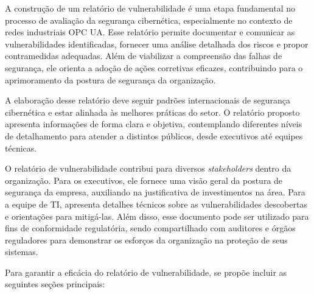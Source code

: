         A construção de um relatório de vulnerabilidade é uma etapa fundamental no processo de avaliação da segurança cibernética, especialmente no contexto de redes industriais OPC UA. Esse relatório permite documentar e comunicar as vulnerabilidades identificadas, fornecer uma análise detalhada dos riscos e propor contramedidas adequadas. Além de viabilizar a compreensão das falhas de segurança, ele orienta a adoção de ações corretivas eficazes, contribuindo para o aprimoramento da postura de segurança da organização.

        A elaboração desse relatório deve seguir padrões internacionais de segurança cibernética e estar alinhada às melhores práticas do setor. O relatório proposto apresenta informações de forma clara e objetiva, contemplando diferentes níveis de detalhamento para atender a distintos públicos, desde executivos até equipes técnicas.
        
        O relatório de vulnerabilidade contribui para diversos \textit{stakeholders} dentro da organização. Para os executivos, ele fornece uma visão geral da postura de segurança da empresa, auxiliando na justificativa de investimentos na área. Para a equipe de TI, apresenta detalhes técnicos sobre as vulnerabilidades descobertas e orientações para mitigá-las. Além disso, esse documento pode ser utilizado para fins de conformidade regulatória, sendo compartilhado com auditores e órgãos reguladores para demonstrar os esforços da organização na proteção de seus sistemas.
        
        Para garantir a eficácia do relatório de vulnerabilidade, se propõe incluir as seguintes seções principais:
        
